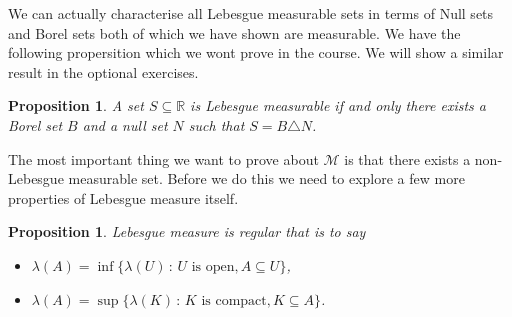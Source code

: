 \documentclass[11pt]{article}
\newtheorem{prp}[thm]{Proposition}
\theoremstyle{definition}
\theoremstyle{remark}
\begin{document}
We can actually characterise all Lebesgue measurable sets in terms of Null sets and Borel sets both of which we have shown are measurable. We have the following propersition which we wont prove in the course. We will show a similar result in the optional exercises.
\begin{prp}
A set $S \subseteq \mathbb{R}$ is Lebesgue measurable if and only there exists a Borel set $B$ and a null set $N$ such that $S = B \triangle N$.
\end{prp}
The most important thing we want to prove about $\mathscr{M}$ is that there exists a non-Lebesgue measurable set. Before we do this we need to explore a few more properties of Lebesgue measure itself.

\begin{prp}
Lebesgue measure is \emph{regular} that is to say
\begin{itemize}
\item $\lambda(A) = \inf \{ \lambda(U)\,:\, \mbox{$U$ is open}, A \subseteq U\}$,
\item $\lambda(A) = \sup \{ \lambda(K)\,:\, \mbox{$K$ is compact}, K \subseteq A\}$.
\end{itemize}
\end{prp}
\end{document}
